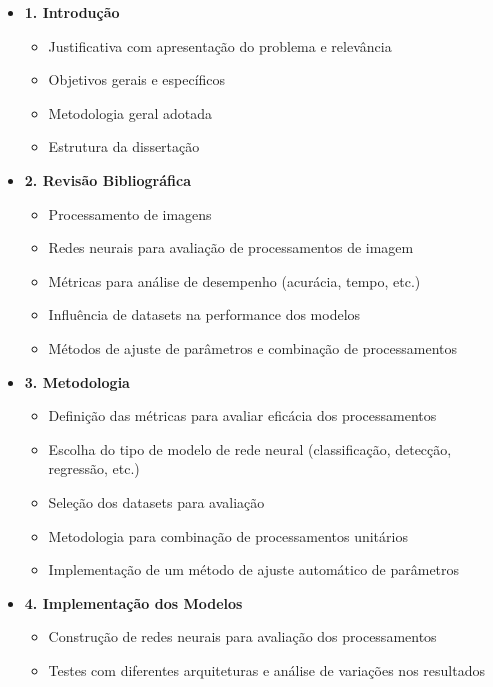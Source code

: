 \begin{itemize}
    \item \textbf{1. Introdução}
    \begin{itemize}
        \item Justificativa com apresentação do problema e relevância
        \item Objetivos gerais e específicos
        \item Metodologia geral adotada
        \item Estrutura da dissertação
    \end{itemize}
    
    \item \textbf{2. Revisão Bibliográfica}
    \begin{itemize}
        \item Processamento de imagens
        \item Redes neurais para avaliação de processamentos de imagem
        \item Métricas para análise de desempenho (acurácia, tempo, etc.)
        \item Influência de datasets na performance dos modelos
        \item Métodos de ajuste de parâmetros e combinação de processamentos
    \end{itemize}

    \item \textbf{3. Metodologia}
    \begin{itemize}
        \item Definição das métricas para avaliar eficácia dos processamentos
        \item Escolha do tipo de modelo de rede neural (classificação, detecção, regressão, etc.)
        \item Seleção dos datasets para avaliação
        \item Metodologia para combinação de processamentos unitários
        \item Implementação de um método de ajuste automático de parâmetros
    \end{itemize}

    \item \textbf{4. Implementação dos Modelos}
    \begin{itemize}
        \item Construção de redes neurais para avaliação dos processamentos
        \item Testes com diferentes arquiteturas e análise de variações nos resultados
    \end{itemize}


\end{itemize}

